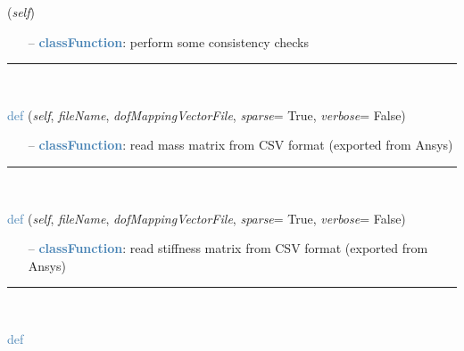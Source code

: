 \begin{itemize}[leftmargin=1.4cm]
\begin{itemize}[leftmargin=1.4cm]
\begin{itemize}[leftmargin=0.5cm]
\begin{itemize}[leftmargin=1.4cm]
\begin{itemize}[leftmargin=1.4cm]
\begin{itemize}[leftmargin=0.5cm]
\begin{flushleft}
({\it self})
\end{flushleft}
\setlength{\itemindent}{0.7cm}
\begin{itemize}[leftmargin=0.7cm]
  \item[--]  \textcolor{steelblue}{\bf classFunction}: perform some consistency checks\vspace{12pt}\end{itemize}
%
\noindent\rule{8cm}{0.75pt}\vspace{1pt} \\ 
\begin{flushleft}
\noindent \textcolor{steelblue}{def {\bf {}}}\label{sec:FEM:FEMinterface:ReadMassMatrixFromAnsys}
({\it self}, {\it fileName}, {\it dofMappingVectorFile}, {\it sparse}= True, {\it verbose}= False)
\end{flushleft}
\setlength{\itemindent}{0.7cm}
\begin{itemize}[leftmargin=0.7cm]
  \item[--]  \textcolor{steelblue}{\bf classFunction}: read mass matrix from CSV format (exported from Ansys)\vspace{12pt}\end{itemize}
%
\noindent\rule{8cm}{0.75pt}\vspace{1pt} \\ 
\begin{flushleft}
\noindent \textcolor{steelblue}{def {\bf {}}}\label{sec:FEM:FEMinterface:ReadStiffnessMatrixFromAnsys}
({\it self}, {\it fileName}, {\it dofMappingVectorFile}, {\it sparse}= True, {\it verbose}= False)
\end{flushleft}
\setlength{\itemindent}{0.7cm}
\begin{itemize}[leftmargin=0.7cm]
  \item[--]  \textcolor{steelblue}{\bf classFunction}: read stiffness matrix from CSV format (exported from Ansys)\vspace{12pt}\end{itemize}
%
\noindent\rule{8cm}{0.75pt}\vspace{1pt} \\ 
\begin{flushleft}
\noindent \textcolor{steelblue}{def {\bf {}}}\label{sec:FEM:FEMinterface:ReadNodalCoordinatesFromAnsys}

\end{flushleft}
\end{itemize}
\end{itemize}
\end{itemize}
\end{itemize}
\end{itemize}
\end{itemize}
